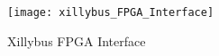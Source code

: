 \begin{figure}[h]
    \centering
    \texttt{[image: xillybus\_FPGA\_Interface]}
    \caption{Xillybus FPGA Interface}
    \label{fig:1_XFI}
\end{figure}